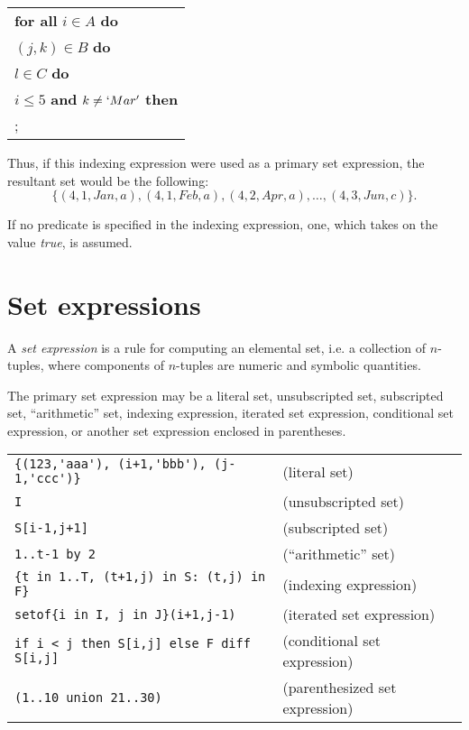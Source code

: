 \documentclass[11pt]{report}
\def\para#1{\noindent{\bf#1}}
\begin{document}
\noindent\hfil
\begin{tabular}{@{}l@{}}
{\bf for all} $i\in A$ {\bf do}\\
\hspace{16pt}{\bf for all} $(j,k)\in B$ {\bf do}\\
\hspace{32pt}{\bf for all} $l\in C$ {\bf do}\\
\hspace{48pt}{\bf if} $i\leq 5$ {\bf and} $k\neq`Mar'$ {\bf then}\\
\hspace{64pt}{\it action};\\
\end{tabular}

\noindent Thus, if this indexing expression were used as a primary set
expression, the resultant set would be the following:
$$\{(4,1,Jan,a),(4,1,Feb,a),(4,2,Apr,a),\dots,(4,3,Jun,c)\}.$$

If no predicate is specified in the indexing expression, one, which
takes on the value {\it true}, is assumed.

\section{Set expressions}

A {\it set expression} is a rule for computing an elemental set, i.e.
a collection of $n$-tuples, where components of $n$-tuples are numeric
and symbolic quantities.

The primary set expression may be a literal set, unsubscripted set,
subscripted set, ``arithmetic'' set, indexing expression, iterated set
expression, conditional set expression, or another set expression
enclosed in parentheses.

\para{Examples}

\noindent
\begin{tabular}{@{}ll@{}}
\verb|{(123,'aaa'), (i+1,'bbb'), (j-1,'ccc')}| &(literal set)\\
\verb|I| &(unsubscripted set)\\
\verb|S[i-1,j+1]| &(subscripted set)\\
\verb|1..t-1 by 2| &(``arithmetic'' set)\\
\verb|{t in 1..T, (t+1,j) in S: (t,j) in F}| &(indexing expression)\\
\verb|setof{i in I, j in J}(i+1,j-1)| &(iterated set expression)\\
\verb|if i < j then S[i,j] else F diff S[i,j]| &(conditional set
expression)\\
\verb|(1..10 union 21..30)| &(parenthesized set expression)\\
\end{tabular}
\end{document}

